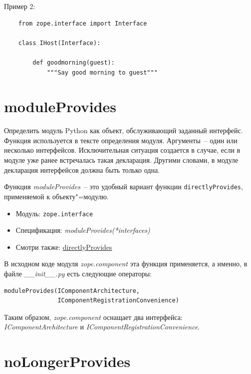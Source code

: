 \documentclass[a4paper,openany,twoside,final]{book}
\providecommand*{\DUroletitlereference}[1]{\textsl{#1}}
\begin{document}
Пример 2:

\begin{verbatim}
    from zope.interface import Interface

    class IHost(Interface):

        def goodmorning(guest):
            """Say good morning to guest"""
\end{verbatim}


\section*{moduleProvides%
  \label{moduleprovides}%
}

Определить модуль Python как объект, обслуживающий заданный интерфейс.  Функция используется в тексте определения модуля.  Аргументы~-- один или несколько интерфейсов.  Исключительная ситуация создается в случае, если в модуле уже ранее встречалась такая декларация.  Другими словами, в модуле декларация интерфейсов должна быть только одна.

Функция \DUroletitlereference{moduleProvides}~-- это удобный вариант функции \texttt{directlyProvides}, применяемой к объекту"=модулю.

\begin{itemize}

\item Модуль: \texttt{zope.interface}

\item Спецификация: \DUroletitlereference{moduleProvides(*interfaces)}

\item Смотри также: \hyperref[directlyprovides]{directlyProvides}

\end{itemize}

В исходном коде модуля \DUroletitlereference{zope.component} эта функция применяется, а именно, в файле \DUroletitlereference{\_\_init\_\_.py} есть следующие операторы:

\begin{verbatim}
moduleProvides(IComponentArchitecture,
               IComponentRegistrationConvenience)
\end{verbatim}

Таким образом, \DUroletitlereference{zope.component} оснащает два интерфейса: \DUroletitlereference{IComponentArchitecture} и \DUroletitlereference{IComponentRegistrationConvenience}.


\section*{noLongerProvides%
  \label{nolongerprovides}%
}
\end{document}
